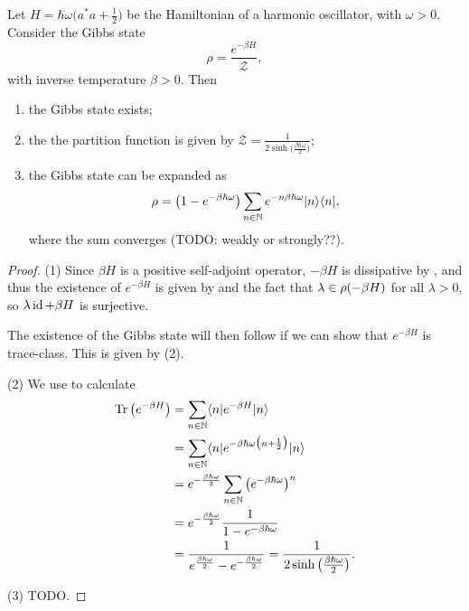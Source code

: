 \begin{proposition}
Let $H = \hbar \omega\big(a^*a + \frac{1}{2}\big)$ be the Hamiltonian of a harmonic oscillator, with $\omega > 0$. Consider the Gibbs state
\[ \rho = \frac{e^{-\beta H}}{\mathcal{Z}}, \]
with inverse temperature $\beta > 0$.
Then
\begin{enumerate}
\item the Gibbs state exists;
\item the the partition function is given by $\mathcal{Z} = \frac{1}{2\sinh\big(\frac{\beta \hbar\omega}{2}\big)}$;
\item the Gibbs state can be expanded as
\[ \rho = \big(1 - e^{-\beta\hbar\omega}\big)\sum_{n\in\mathbb{N}}e^{-n\beta\hbar\omega}|n\rangle\langle n|, \]
where the sum converges (TODO: weakly or strongly??).
\end{enumerate}
\end{proposition}
\begin{proof}
(1) Since $\beta H$ is a positive self-adjoint operator, $-\beta H$ is dissipative by , and thus the existence of $e^{-\beta H}$ is given by  and the fact that $\lambda \in \rho(-\beta H)$ for all $\lambda >0$, so $\lambda\operatorname{id} + \beta H$ is surjective.

The existence of the Gibbs state will then follow if we can show that $e^{-\beta H}$ is trace-class. This is given by (2).

(2) We use  to calculate
\begin{align*}
\Tr\big(e^{-\beta H}\big) &= \sum_{n\in\N}\braket[e^{-\beta H}]{n}{n} \\
&= \sum_{n\in\N}\braket[e^{-\beta \hbar \omega\big(n + \frac{1}{2}\big)}]{n}{n} \\
&= e^{- \frac{\beta\hbar\omega}{2}}\sum_{n\in\N}\big(e^{-\beta \hbar \omega}\big)^n \\
&= e^{- \frac{\beta\hbar\omega}{2}}\frac{1}{1 - e^{-\beta \hbar \omega}} \\
&= \frac{1}{e^{\frac{\beta\hbar\omega}{2}} - e^{- \frac{\beta\hbar\omega}{2}}} = \frac{1}{2\sinh\big(\frac{\beta \hbar\omega}{2}\big)}.
\end{align*}

(3) TODO.
\end{proof}